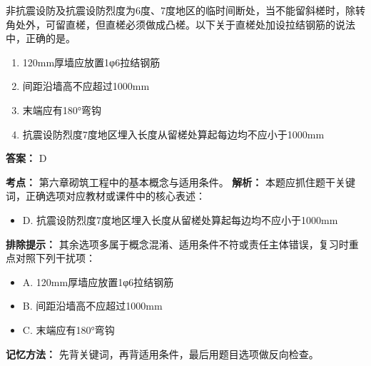 \documentclass[UTF8,fontset=fandol,11pt]{ctexart}
\begin{document}
\begin{quizbox}[title={第 21 题}]
非抗震设防及抗震设防烈度为6度、7度地区的临时间断处，当不能留斜槎时，除转角处外，可留直槎，但直槎必须做成凸槎。以下关于直槎处加设拉结钢筋的说法中，正确的是。\\
\begin{enumerate}[label=\Alph*.]
\item 120mm厚墙应放置1φ6拉结钢筋
\item 间距沿墙高不应超过1000mm
\item 末端应有180°弯钩
\item 抗震设防烈度7度地区埋入长度从留槎处算起每边均不应小于1000mm
\end{enumerate}
\textbf{答案：} D
\vspace{0.25em}
\begin{answerbox}[title={考点解析}]
\textbf{考点：} 第六章砌筑工程中的基本概念与适用条件。
\textbf{解析：} 本题应抓住题干关键词，正确选项对应教材或课件中的核心表述：
\begin{itemize}
\item D. 抗震设防烈度7度地区埋入长度从留槎处算起每边均不应小于1000mm
\end{itemize}
\textbf{排除提示：} 其余选项多属于概念混淆、适用条件不符或责任主体错误，复习时重点对照下列干扰项：
\begin{itemize}
\item A. 120mm厚墙应放置1φ6拉结钢筋
\item B. 间距沿墙高不应超过1000mm
\item C. 末端应有180°弯钩
\end{itemize}
\textbf{记忆方法：} 先背关键词，再背适用条件，最后用题目选项做反向检查。
\end{answerbox}
\end{quizbox}
\end{document}

